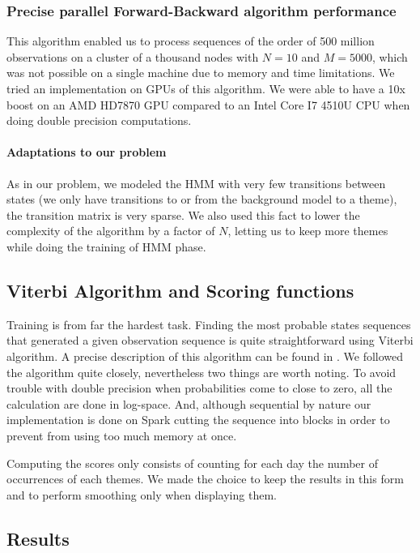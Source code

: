 \subsubsection*{Precise parallel Forward-Backward algorithm performance}
This algorithm enabled us to process sequences of the order of 500 million observations on a cluster of a thousand nodes with $N=10$ and $M=5000$, which was not possible on a single machine due to memory and time limitations.
We tried an implementation on GPUs of this algorithm. We were able to have a 10x boost on an AMD HD7870 GPU compared to an Intel Core I7 4510U CPU when doing double precision computations.

\paragraph{Adaptations to our problem}
As in our problem, we modeled the HMM with very few transitions between states (we only have transitions to or from the background model to a theme), the transition matrix is very sparse. We also used this fact to lower the complexity of the algorithm by a factor of $N$, letting us to keep more themes while doing the training of HMM phase.

\subsection{Viterbi Algorithm and Scoring functions}
Training is from far the hardest task. Finding the most probable states sequences that generated a given observation sequence is quite straightforward using Viterbi algorithm. A precise description of this algorithm can be found in \cite{rabiner1989tutorial}.
We followed the algorithm quite closely, nevertheless two things are worth noting. To avoid trouble with double precision when probabilities come to close to zero, all the calculation are done in log-space. And, although sequential by nature our implementation is done on Spark cutting the sequence into blocks in order to prevent from using too much memory at once.

Computing the scores only consists of counting for each day the number of occurrences of each themes. We made the choice to keep the results in this form and to perform smoothing only when displaying them.

\subsection{Results}




